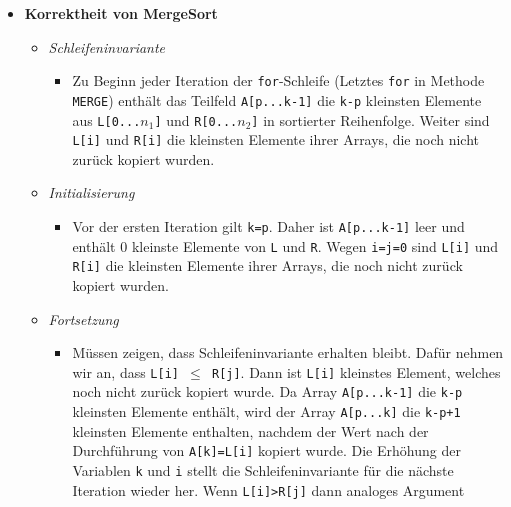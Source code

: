 \begin{itemize}
\pagebreak

        \item \textbf{Korrektheit von MergeSort}
            \begin{itemize}
                \item \textit{Schleifeninvariante}
                    \begin{itemize}
                        \item[]
                            Zu Beginn jeder Iteration der \texttt{for}-Schleife (Letztes \texttt{for} in Methode \texttt{MERGE}) enthält
                            das Teilfeld \texttt{A[p...k-1]} die \texttt{k-p} kleinsten Elemente aus \texttt{L[0...$n_1$]} und \texttt{R[0...$n_2$]}
                            in sortierter Reihenfolge. Weiter sind \texttt{L[i]} und \texttt{R[i]} die kleinsten Elemente ihrer Arrays, die noch nicht
                            zurück kopiert wurden.
                    \end{itemize}
                \item \textit{Initialisierung}
                    \begin{itemize}
                        \item[]
                            Vor der ersten Iteration gilt \texttt{k=p}. Daher ist \texttt{A[p...k-1]} leer und enthält 0 kleinste Elemente von 
                            \texttt{L} und \texttt{R}. Wegen \texttt{i=j=0} sind \texttt{L[i]} und \texttt{R[i]} die kleinsten Elemente ihrer 
                            Arrays, die noch nicht zurück kopiert wurden.
                    \end{itemize}
                \item \textit{Fortsetzung}
                    \begin{itemize}
                        \item[]
                            Müssen zeigen, dass Schleifeninvariante erhalten bleibt. Dafür nehmen wir an, dass \texttt{L[i] $\leq$ R[j]}. Dann ist 
                            \texttt{L[i]} kleinstes Element, welches noch nicht zurück kopiert wurde. Da Array \texttt{A[p...k-1]} die \texttt{k-p}
                            kleinsten Elemente enthält, wird der Array \texttt{A[p...k]} die \texttt{k-p+1} kleinsten Elemente enthalten, nachdem 
                            der Wert nach der Durchführung von \texttt{A[k]=L[i]} kopiert wurde. Die Erhöhung der Variablen \texttt{k} und \texttt{i}
                            stellt die Schleifeninvariante für die nächste Iteration wieder her. Wenn \texttt{L[i]>R[j]} dann analoges Argument 

\end{itemize}
\end{itemize}
\end{itemize}
